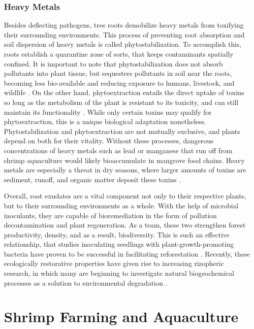 \subsubsection{Heavy Metals}

  Besides deflecting pathogens, tree roots demobilize heavy metals from toxifying their surrounding environments. This process of preventing root absorption and soil dispersion of heavy metals is called phytostabilization. To accomplish this, roots establish a quarantine zone of sorts, that keeps contaminants spatially confined. It is important to note that phytostabilization does not absorb pollutants into plant tissue, but sequesters pollutants in soil near the roots, becoming less bio-available and reducing exposure to humans, livestock, and wildlife \citep{deBashana2012ThePC}. On the other hand, phytoextraction entails the direct uptake of toxins so long as the metabolism of the plant is resistant to its toxicity, and can still maintain its functionality \citep{mccutcheon2003overview}. While only certain toxins may qualify for phytoextraction, this is a unique biological adaptation nonetheless. Phytostabilization and phytoextraction are not mutually exclusive, and plants depend on both for their vitality. Without these processes, dangerous concentrations of heavy metals such as lead or manganese that run off from shrimp aquaculture would likely bioaccumulate in mangrove food chains. Heavy metals are especially a threat in dry seasons, where larger amounts of toxins are sediment, runoff, and organic matter deposit these toxins \citep{handayani2015migration}.  


  Overall, root exudates are a vital component not only to their respective plants, but to their surrounding environments as a whole. With the help of microbial inoculants, they are capable of bioremediation in the form of pollution decontamination and plant regeneration. As a team, these two strengthen forest productivity, density, and as a result, biodiversity. This is such an effective relationship, that studies inoculating seedlings with plant-growth-promoting bacteria have proven to be successful in facilitating reforestation \citep{bashan2008environmental}. Recently, these ecologically restorative properties have given rise to increasing rizopheric research, in which many are beginning to investigate natural biogeochemical processes as a solution to environmental degradation \citep{shukla2011nature}. 


\section{Shrimp Farming and Aquaculture}

